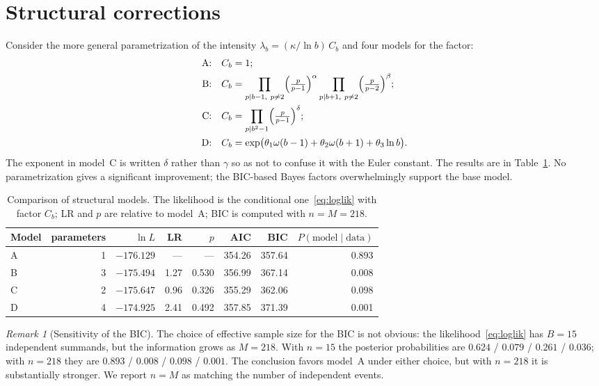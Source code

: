 \documentclass[11pt,a4paper]{article}
\theoremstyle{plain}
\theoremstyle{remark}
\newtheorem{remark}{Remark}
\begin{document}
\section{Structural corrections}\label{sec:struct}

Consider the more general parametrization of the intensity
$\lambda_b=(\kappa/\ln b)\,C_b$ and four models for the factor:
\begin{align*}
\text{A:}&\quad C_b=1;\\
\text{B:}&\quad C_b=\prod_{p\mid b-1,\ p\ne2}\Bigl(\tfrac{p}{p-1}\Bigr)^{\alpha}
                 \prod_{p\mid b+1,\ p\ne2}\Bigl(\tfrac{p}{p-2}\Bigr)^{\beta};\\
\text{C:}&\quad C_b=\prod_{p\mid b^2-1}\Bigl(\tfrac{p}{p-1}\Bigr)^{\delta};\\
\text{D:}&\quad C_b=\exp\bigl(\theta_1\omega(b-1)+\theta_2\omega(b+1)+\theta_3\ln b\bigr).
\end{align*}
The exponent in model~C is written $\delta$ rather than $\gamma$ so as not to
confuse it with the Euler constant. The results are in Table~\ref{tab:struct}.
No parametrization gives a significant improvement; the BIC-based Bayes factors
overwhelmingly support the base model.

\begin{table}[t]
\centering
\caption{Comparison of structural models. The likelihood is the conditional
one~\eqref{eq:loglik} with factor $C_b$; LR and $p$ are relative to model~A;
BIC is computed with $n=M=218$.}
\label{tab:struct}
\small
\begin{tabular}{lrrrrrrr}
\toprule
Model & parameters & $\ln L$ & LR & $p$ & AIC & BIC & $P(\text{model}\mid\text{data})$\\
\midrule
A & 1 & $-176.129$ & --- & --- & 354.26 & 357.64 & 0.893\\
B & 3 & $-175.494$ & 1.27 & 0.530 & 356.99 & 367.14 & 0.008\\
C & 2 & $-175.647$ & 0.96 & 0.326 & 355.29 & 362.06 & 0.098\\
D & 4 & $-174.925$ & 2.41 & 0.492 & 357.85 & 371.39 & 0.001\\
\bottomrule
\end{tabular}
\end{table}

\begin{remark}[Sensitivity of the BIC]
The choice of effective sample size for the BIC is not obvious: the
likelihood~\eqref{eq:loglik} has $B=15$ independent summands, but the
information grows as $M=218$. With $n=15$ the posterior probabilities are
$0.624$ / $0.079$ / $0.261$ / $0.036$; with $n=218$ they are
$0.893$ / $0.008$ / $0.098$ / $0.001$. The conclusion favors model~A under
either choice, but with $n=218$ it is substantially stronger. We report $n=M$ as
matching the number of independent events.
\end{remark}
\end{document}
